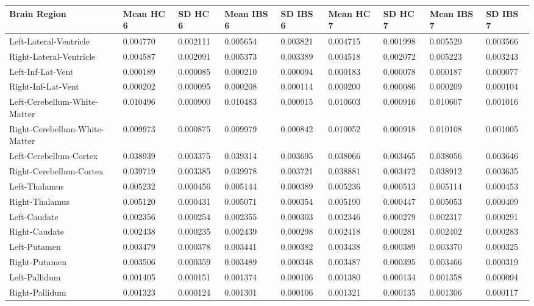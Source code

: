 \begin{tabular}{lllllllll}
\toprule
Brain Region & Mean HC 6 & SD HC 6 & Mean IBS 6 & SD IBS 6 & Mean HC 7 & SD HC 7 & Mean IBS 7 & SD IBS 7 \\
\midrule
Left-Lateral-Ventricle & 0.004770 & 0.002111 & 0.005654 & 0.003821 & 0.004715 & 0.001998 & 0.005529 & 0.003566 \\
Right-Lateral-Ventricle & 0.004587 & 0.002091 & 0.005373 & 0.003389 & 0.004518 & 0.002072 & 0.005223 & 0.003243 \\
Left-Inf-Lat-Vent & 0.000189 & 0.000085 & 0.000210 & 0.000094 & 0.000183 & 0.000078 & 0.000187 & 0.000077 \\
Right-Inf-Lat-Vent & 0.000202 & 0.000095 & 0.000208 & 0.000114 & 0.000200 & 0.000086 & 0.000209 & 0.000104 \\
Left-Cerebellum-White-Matter & 0.010496 & 0.000900 & 0.010483 & 0.000915 & 0.010603 & 0.000916 & 0.010607 & 0.001016 \\
Right-Cerebellum-White-Matter & 0.009973 & 0.000875 & 0.009979 & 0.000842 & 0.010052 & 0.000918 & 0.010108 & 0.001005 \\
Left-Cerebellum-Cortex & 0.038939 & 0.003375 & 0.039314 & 0.003695 & 0.038066 & 0.003465 & 0.038056 & 0.003646 \\
Right-Cerebellum-Cortex & 0.039719 & 0.003385 & 0.039978 & 0.003721 & 0.038881 & 0.003472 & 0.038912 & 0.003635 \\
Left-Thalamus & 0.005232 & 0.000456 & 0.005144 & 0.000389 & 0.005236 & 0.000513 & 0.005114 & 0.000453 \\
Right-Thalamus & 0.005120 & 0.000431 & 0.005071 & 0.000354 & 0.005190 & 0.000447 & 0.005053 & 0.000409 \\
Left-Caudate & 0.002356 & 0.000254 & 0.002355 & 0.000303 & 0.002346 & 0.000279 & 0.002317 & 0.000291 \\
Right-Caudate & 0.002438 & 0.000235 & 0.002439 & 0.000298 & 0.002418 & 0.000281 & 0.002402 & 0.000283 \\
Left-Putamen & 0.003479 & 0.000378 & 0.003441 & 0.000382 & 0.003438 & 0.000389 & 0.003370 & 0.000325 \\
Right-Putamen & 0.003506 & 0.000359 & 0.003489 & 0.000348 & 0.003487 & 0.000395 & 0.003466 & 0.000319 \\
Left-Pallidum & 0.001405 & 0.000151 & 0.001374 & 0.000106 & 0.001380 & 0.000134 & 0.001358 & 0.000094 \\
Right-Pallidum & 0.001323 & 0.000124 & 0.001301 & 0.000106 & 0.001321 & 0.000135 & 0.001306 & 0.000117 \\

\end{tabular}
